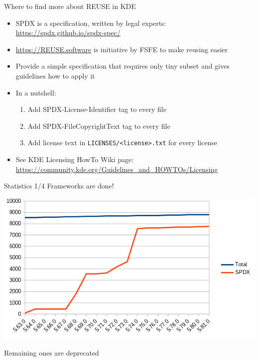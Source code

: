 \documentclass[t,compress,aspectratio=169]{beamer}
\begin{document}
\begin{frame}
    {Where to find more about REUSE in KDE}

    \begin{itemize}
        \item SPDX is a specification, written by legal experts:\\
            \url{https://spdx.github.io/spdx-spec/}
        \item \url{https://REUSE.software} is initiative by FSFE to make reusing easier
        \item Provide a simple specification that requires only tiny subset and gives guidelines how to apply it
        \item In a nutshell:
            \begin{enumerate}
                \item Add SPDX-License-Identifier tag to every file
                \item Add SPDX-FileCopyrightText tag to every file
                \item Add license text in \texttt{LICENSES/<license>.txt} for every license
            \end{enumerate}
        \item See KDE Licensing HowTo Wiki page: \url{https://community.kde.org/Guidelines_and_HOWTOs/Licensing}
    \end{itemize}
\end{frame}

\begin{frame}
    {Statistics 1/4}
    {Frameworks are done!}
    
    \begin{center}
        \includegraphics[height=.6\paperheight]{kde-frameworks}
    \end{center}
    
    Remaining ones are deprecated
\end{frame}
\end{document}

